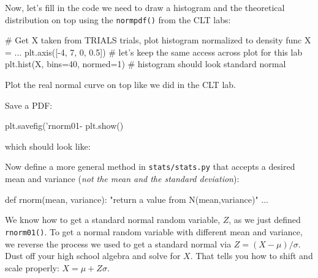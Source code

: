 \begin{fullwidth}
\step Now, let's fill in the code we need to draw a histogram and  the theoretical distribution on top using the {\tt normpdf()} from the CLT labs:

\begin{pyverbatim}
# Get X taken from TRIALS trials, plot histogram normalized to density func
X = ...
plt.axis([-4, 7, 0, 0.5]) # let's keep the same access across plot for this lab
plt.hist(X, bins=40, normed=1) # histogram should look standard normal
\end{pyverbatim}

\step Plot the real normal curve on top like we did in the CLT lab.

\step Save a PDF:

\begin{pyverbatim}
plt.savefig('rnorm01-%
plt.show()
\end{pyverbatim}

\noindent which should look like:


\step Now define a more general method in {\tt stats/stats.py} that accepts a desired mean and variance ({\em not the mean and the standard deviation}):

\begin{pyverbatim}
def rnorm(mean, variance):
    "return a value from N(mean,variance)"
    ...
\end{pyverbatim}

\noindent We know how to get a standard normal random variable, $Z$, as we just defined {\tt rnorm01()}. To get a normal random variable with different mean and variance, we reverse the process we used to get a standard normal via $Z = (X-\mu)/\sigma$. Dust off your high school algebra and solve for $X$. That tells you how to shift and scale properly: $X = \mu+ Z\sigma$.


\end{fullwidth}
